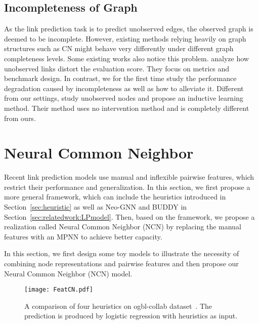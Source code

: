 \documentclass{article}
\theoremstyle{plain}
\theoremstyle{definition}
\theoremstyle{remark}
\begin{document}
\subsection{Incompleteness of Graph}

As the link prediction task is to predict unobserved edges, the observed graph is deemed to be incomplete. However, existing methods relying heavily on graph structures such as CN might behave very differently under different graph completeness levels. Some existing works also notice this problem. \citet{OpenworldKG} analyze how unobserved links distort the evaluation score. They focus on metrics and benchmark design. In contrast, we for the first time study the performance degradation caused by incompleteness as well as how to alleviate it. Different from our settings, \citet{entityopenworld} study unobserved nodes and propose an inductive learning method. Their method uses no intervention method and is completely different from ours.  



\section{Neural Common Neighbor}\label{sec:NCN}


Recent link prediction models use manual and inflexible pairwise features, which restrict their performance and generalization. In this section, we first propose a more general framework, which can include the heuristics introduced in Section~\ref{sec:heuristic} as well as Neo-GNN and BUDDY in Section~\ref{sec:relatedwork:LPmodel}.
Then, based on the framework, we propose a realization called
Neural Common Neighbor (NCN) by replacing the manual features with an MPNN to achieve better capacity.


\iffalse
In this section, we first design some toy models to illustrate the necessity of combining node representations and pairwise features and then propose our Neural Common Neighbor (NCN) model. 
\begin{figure}[t]
    \vskip 0.2in
    \centering    \texttt{[image: FeatCN.pdf]}
    \caption{A comparison of four heuristics on ogbl-collab dataset~\citep{OGB}. The prediction is produced by logistic regression with heuristics as input.}
    \label{fig:visheuristic}
    \vskip -0.2in
\end{figure}
\end{document}
